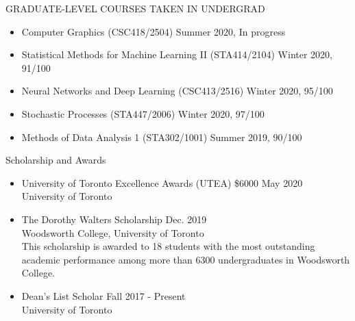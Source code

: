 \documentclass{resume} %
\newcommand{\tab}[1]{\hspace{.2667\textwidth}\rlap{#1}}
\newcommand{\itab}[1]{\hspace{0em}\rlap{#1}}
\begin{document}
\begin{rSection}{GRADUATE-LEVEL COURSES TAKEN IN UNDERGRAD}
\begin{itemize}
	\item Computer Graphics (CSC418/2504) \hfill{Summer 2020, In progress}
	\item Statistical Methods for Machine Learning II (STA414/2104) \hfill{Winter 2020, 91/100}
	\item Neural Networks and Deep Learning (CSC413/2516) \hfill{Winter 2020, 95/100}
	\item Stochastic Processes (STA447/2006) \hfill{Winter 2020, 97/100}
	\item Methods of Data Analysis 1 (STA302/1001) \hfill{Summer 2019, 90/100}
\end{itemize}
\end{rSection}

\begin{rSection}{Scholarship and Awards}
\begin{itemize}
	\item University of Toronto Excellence Awards (UTEA) \$6000 \hfill{May 2020} \\
	University of Toronto
	\item The Dorothy Walters Scholarship \hfill{Dec. 2019}\\
	Woodsworth College, University of Toronto\\
	This scholarship is awarded to 18 students with the most outstanding academic performance among more than 6300 undergraduates in Woodsworth College.
	\item Dean's List Scholar \hfill{Fall 2017 - Present}\\
	University of Toronto
\end{itemize}
\end{rSection}
\end{document}
